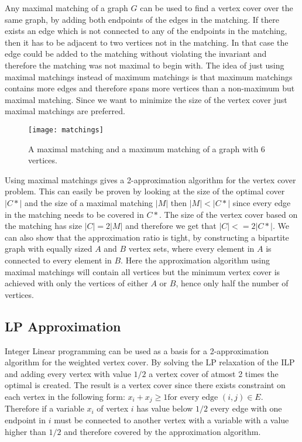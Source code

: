 Any maximal matching of a graph $G$ can be used to find a vertex cover over the same graph, by adding both endpoints of the edges in the matching. If there exists an edge which is not connected to any of the endpoints in the matching, then it has to be adjacent to two vertices not in the matching. In that case the edge could be added to the matching without violating the invariant and therefore the matching was not maximal to begin with. The idea of just using maximal matchings instead of maximum matchings is that maximum matchings contains more edges and therefore spans more vertices than a non-maximum but maximal matching. Since we want to minimize the size of the vertex cover just maximal matchings are preferred.

\begin{figure}[H]
    \centering
    \texttt{[image: matchings]}
    \caption{A maximal matching and a maximum matching of a graph with 6 vertices.}
\end{figure}

Using maximal matchings gives a 2-approximation algorithm for the vertex cover problem. This can easily be proven by looking at the size of the optimal cover $|C*|$ and the size of a maximal matching $|M|$ then $|M| < |C*|$ since every edge in the matching needs to be covered in $C*$. The size of the vertex cover based on the matching has size $|C|=2|M|$ and therefore we get that $|C| <= 2|C*|$. We can also show that the approximation ratio is tight, by constructing a bipartite graph with equally sized $A$ and $B$ vertex sets, where every element in $A$ is connected to every element in $B$. Here the approximation algorithm using maximal matchings will contain all vertices but the minimum vertex cover is achieved with only the vertices of either $A$ or $B$, hence only half the number of vertices.

\subsection{LP Approximation}
Integer Linear programming can be used as a basis for a 2-approximation algorithm for the weighted vertex cover. By solving the LP relaxation of the ILP and adding every vertex with value $1/2$ a vertex cover of atmost 2 times the optimal is created. The result is a vertex cover since there exists constraint on each vertex in the following form: $x_i + x_j \ge 1 \text{for every edge } (i,j) \in E$. Therefore if a variable $x_i$ of vertex $i$ has value below $1/2$ every edge with one endpoint in $i$ must be connected to another vertex with a variable with a value higher than $1/2$ and therefore covered by the approximation algorithm.

